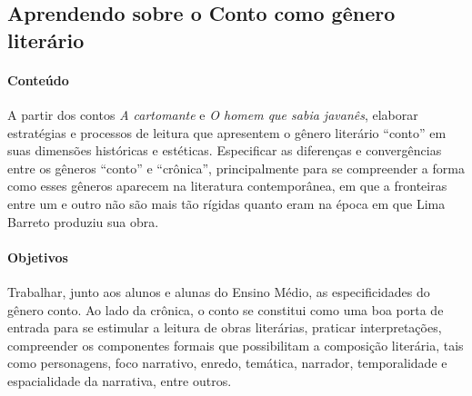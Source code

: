 \documentclass{extarticle}
\begin{document}

\subsection{Aprendendo sobre o Conto como gênero literário}


\paragraph{Conteúdo} A partir dos contos \textit{\emph{A cartomante}} e
{\textit{O homem que sabia javanês}}, elaborar estratégias e
processos de leitura que apresentem o gênero literário ``conto'' em suas
dimensões históricas e estéticas. Especificar as diferenças e
convergências entre os gêneros ``conto'' e ``crônica'', principalmente
para se compreender a forma como esses gêneros aparecem na literatura
contemporânea, em que a fronteiras entre um e outro não são mais tão
rígidas quanto eram na época em que Lima Barreto produziu sua obra.

\paragraph{Objetivos} Trabalhar, junto aos alunos e alunas do Ensino
Médio, as especificidades do gênero conto. Ao lado da crônica, o conto
se constitui como uma boa porta de entrada para se estimular a leitura
de obras literárias, praticar interpretações, compreender os componentes
formais que possibilitam a composição literária, tais como personagens,
foco narrativo, enredo, temática, narrador, temporalidade e
espacialidade da narrativa, entre outros.
\end{document}
